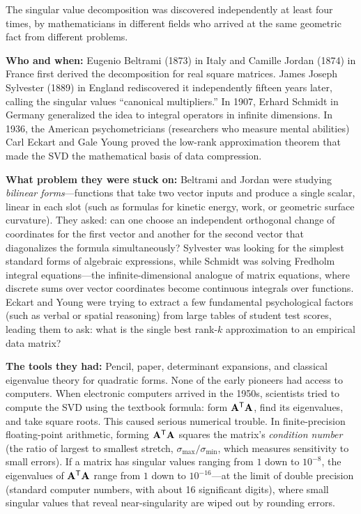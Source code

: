 \begin{historybox}
The singular value decomposition was discovered independently at least four times, by mathematicians in different fields who arrived at the same geometric fact from different problems.

\textbf{Who and when:} Eugenio Beltrami (1873) in Italy and Camille Jordan (1874) in France first derived the decomposition for real square matrices. James Joseph Sylvester (1889) in England rediscovered it independently fifteen years later, calling the singular values ``canonical multipliers.'' In 1907, Erhard Schmidt in Germany generalized the idea to integral operators in infinite dimensions. In 1936, the American psychometricians (researchers who measure mental abilities) Carl Eckart and Gale Young proved the low-rank approximation theorem that made the SVD the mathematical basis of data compression.

\textbf{What problem they were stuck on:} Beltrami and Jordan were studying \emph{bilinear forms}---functions that take two vector inputs and produce a single scalar, linear in each slot (such as formulas for kinetic energy, work, or geometric surface curvature). They asked: can one choose an independent orthogonal change of coordinates for the first vector and another for the second vector that diagonalizes the formula simultaneously? Sylvester was looking for the simplest standard forms of algebraic expressions, while Schmidt was solving Fredholm integral equations---the infinite-dimensional analogue of matrix equations, where discrete sums over vector coordinates become continuous integrals over functions. Eckart and Young were trying to extract a few fundamental psychological factors (such as verbal or spatial reasoning) from large tables of student test scores, leading them to ask: what is the single best rank-$k$ approximation to an empirical data matrix?

\textbf{The tools they had:} Pencil, paper, determinant expansions, and classical eigenvalue theory for quadratic forms. None of the early pioneers had access to computers. When electronic computers arrived in the 1950s, scientists tried to compute the SVD using the textbook formula: form $\mathbf{A}^{\mathsf{T}}\mathbf{A}$, find its eigenvalues, and take square roots. This caused serious numerical trouble. In finite-precision floating-point arithmetic, forming $\mathbf{A}^{\mathsf{T}}\mathbf{A}$ squares the matrix's \emph{condition number} (the ratio of largest to smallest stretch, $\sigma_{\max}/\sigma_{\min}$, which measures sensitivity to small errors). If a matrix has singular values ranging from $1$ down to $10^{-8}$, the eigenvalues of $\mathbf{A}^{\mathsf{T}}\mathbf{A}$ range from $1$ down to $10^{-16}$---at the limit of double precision (standard computer numbers, with about 16 significant digits), where small singular values that reveal near-singularity are wiped out by rounding errors.


\end{historybox}
